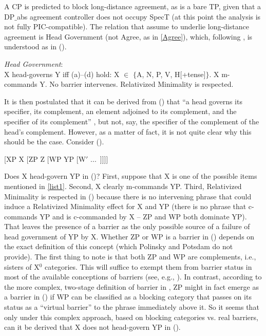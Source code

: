 \documentclass[output=paper
,modfonts
,nonflat]{langsci/langscibook}
\begin{document}
 A CP is predicted to block long-distance agreement, as is a bare TP,
 given that a DP$\_${abs} agreement controller does not occupy SpecT (at
 this point the analysis is not fully PIC-compatible). The relation
 that \cite{Polinsky&Potsdam:01} assume to underlie long-distance
 agreement is  Head Government (not Agree, as in \ref{Agree}),
 which, following \cite{Rizzi:90}, is understood as in (\Next).

\ea\label{ex:mueller:11} {\itshape Head Government}:\\
X head-governs Y iff (a)--(d) hold:
\ea \label{list1}X $\in$ $\{$A, N, P, V, H[+{\rm tense}]$\}$.
\ex X m-commands Y.
\ex No barrier intervenes.
\ex Relativized Minimality is respected. 
\z
\z

It is then postulated that it can be derived from (\Last) that ``a head
governs its specifier, its complement, an element adjoined to its
complement, and the specifier of its complement''
\citep[627]{Polinsky&Potsdam:01}, but not, say, the specifier of
the complement of the head's complement. However, as a matter of fact,
  it is not quite clear why this should be the case. Consider (\Next).

\ea\label{ex:mueller:12} [XP X [ZP \label{vcp}Z [WP YP [W$'$ ...~]]]] \z

Does X head-govern YP in (\Last)? First, suppose that X is one of the
possible items mentioned in \ref{list1}. Second, X clearly m-commands
YP. Third, Relativized Minimality is respected in (\Last) because there
is no intervening phrase that could induce a Relativized Minimality
effect for X and YP (there is no phrase that c-commands YP and is
c-commanded by X -- ZP and WP both dominate YP). That leaves the
presence of a barrier as the only possible source of a failure of
head government of YP by X. Whether ZP or WP is a barrier in (\Last)
depends on the exact definition of this concept (which Polinsky and
Potsdam do not provide). The first thing to note is that both ZP and
WP are complements, i.e., sisters of X$^0$ categories. This will
suffice to exempt them from barrier status in most of the available
conceptions of barriers (see, e.g., \cite{Cinque:90}). In contrast,
according to the more complex, two-stage definition of barrier in
\cite{Chomsky:86}, ZP might in fact emerge as a barrier in (\Last) if WP
can be classified as a blocking category that passes on its status as
a ``virtual barrier'' to the phrase immediately above it. So it seems
that only under this complex approach, based on blocking categories
vs. real barriers, can it be derived that X does not head-govern YP in
(\Last). 
\end{document}
